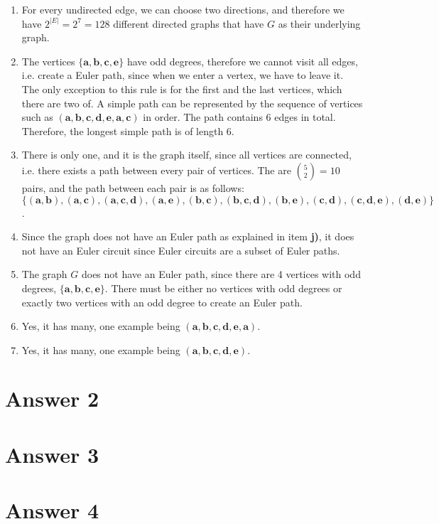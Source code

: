 \documentclass[12pt]{article}
\begin{document}
\begin{enumerate}
\item
For every undirected edge, we can choose two directions, and therefore we have $2^{|E|} = 2^7 = 128$ different directed graphs that have $G$ as their underlying graph.

\newpage

\item
The vertices $\{\textbf{a}, \textbf{b}, \textbf{c}, \textbf{e}\}$ have odd degrees, therefore we cannot visit all edges, i.e. create a Euler path, since when we enter a vertex, we have to leave it.
The only exception to this rule is for the first and the last vertices, which there are two of.
A simple path can be represented by the sequence of vertices such as $(\textbf{a}, \textbf{b}, \textbf{c}, \textbf{d}, \textbf{e}, \textbf{a}, \textbf{c})$ in order.
The path contains 6 edges in total.
Therefore, the longest simple path is of length 6.

\item
There is only one, and it is the graph itself, since all vertices are connected, i.e. there exists a path between every pair of vertices.
The are $\binom{5}{2} = 10$ pairs, and the path between each pair is as follows: $\{(\textbf{a}, \textbf{b}), (\textbf{a}, \textbf{c}), (\textbf{a}, \textbf{c}, \textbf{d}), (\textbf{a}, \textbf{e}), (\textbf{b}, \textbf{c}), (\textbf{b}, \textbf{c}, \textbf{d}), (\textbf{b}, \textbf{e}), (\textbf{c}, \textbf{d}), (\textbf{c}, \textbf{d}, \textbf{e}), (\textbf{d}, \textbf{e})\}$.

\item
Since the graph does not have an Euler path as explained in item \textbf{j)}, it does not have an Euler circuit since Euler circuits are a subset of Euler paths.

\item
The graph $G$ does not have an Euler path, since there are 4 vertices with odd degrees, $\{\textbf{a}, \textbf{b}, \textbf{c}, \textbf{e}\}$.
There must be either no vertices with odd degrees or exactly two vertices with an odd degree to create an Euler path.

\item
Yes, it has many, one example being $(\textbf{a}, \textbf{b}, \textbf{c}, \textbf{d}, \textbf{e}, \textbf{a})$.

\item
Yes, it has many, one example being $(\textbf{a}, \textbf{b}, \textbf{c}, \textbf{d}, \textbf{e})$.

\end{enumerate}

\section*{Answer 2}


\section*{Answer 3}


\section*{Answer 4}
\end{document}
